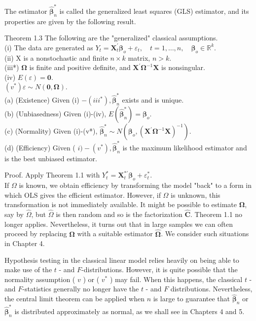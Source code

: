 \documentclass[10pt]{article}
\begin{document}
The estimator $\hat{\boldsymbol{\beta}}_{n}^{*}$ is called the generalized least squares (GLS) estimator, and its properties are given by the following result.

Theorem 1.3 The following are the "generalized" classical assumptions.\\
(i) The data are generated as $Y_{t}=\mathbf{X}_{t}^{\prime} \boldsymbol{\beta}_{o}+\varepsilon_{t}, \quad t=1, \ldots, n, \quad \boldsymbol{\beta}_{o} \in \mathbb{R}^{k}$.\\
(ii) X is a nonstochastic and finite $n \times k$ matrix, $n>k$.\\
(iii*) $\boldsymbol{\Omega}$ is finite and positive definite, and $\mathbf{X}^{\prime} \boldsymbol{\Omega}^{-1} \mathbf{X}$ is nonsingular.\\
(iv) $E(\varepsilon)=\mathbf{0}$.\\
$\left(v^{*}\right) \varepsilon \sim N(\mathbf{0}, \boldsymbol{\Omega})$.\\
(a) (Existence) Given (i) $-\left(i i i^{*}\right), \hat{\boldsymbol{\beta}}_{n}^{*}$ exists and is unique.\\
(b) (Unbiasedness) Given (i)-(iv), $E\left(\hat{\boldsymbol{\beta}}_{n}^{*}\right)=\boldsymbol{\beta}_{o}$.\\
(c) (Normality) Given (i)-(v*), $\hat{\boldsymbol{\beta}}_{n}^{*} \sim N\left(\boldsymbol{\beta}_{o},\left(\mathbf{X}^{\prime} \boldsymbol{\Omega}^{-1} \mathbf{X}\right)^{-1}\right)$.\\
(d) (Efficiency) Given ( $i)-\left(v^{*}\right), \hat{\boldsymbol{\beta}}_{n}^{*}$ is the maximum likelihood estimator and is the best unbiased estimator.

Proof. Apply Theorem 1.1 with $Y_{t}^{*}=\mathbf{X}_{t}^{* \prime} \boldsymbol{\beta}_{o}+\varepsilon_{t}^{*}$.\\
If $\Omega$ is known, we obtain efficiency by transforming the model "back" to a form in which OLS gives the efficient estimator. However, if $\Omega$ is unknown, this transformation is not immediately available. It might be possible to estimate $\boldsymbol{\Omega}$, say by $\hat{\Omega}$, but $\hat{\Omega}$ is then random and so is the factorization $\hat{\mathbf{C}}$. Theorem 1.1 no longer applies. Nevertheless, it turns out that in large samples we can often proceed by replacing $\boldsymbol{\Omega}$ with a suitable estimator $\hat{\boldsymbol{\Omega}}$. We consider such situations in Chapter 4.

Hypothesis testing in the classical linear model relies heavily on being able to make use of the $t$ - and $F$-distributions. However, it is quite possible that the normality assumption ( $v$ ) or ( $v^{*}$ ) may fail. When this happens, the classical $t$ - and $F$-statistics generally no longer have the $t$ - and $F$ distributions. Nevertheless, the central limit theorem can be applied when $n$ is large to guarantee that $\hat{\boldsymbol{\beta}}_{n}$ or $\hat{\boldsymbol{\beta}}_{n}^{*}$ is distributed approximately as normal, as we shall see in Chapters 4 and 5.
\end{document}
